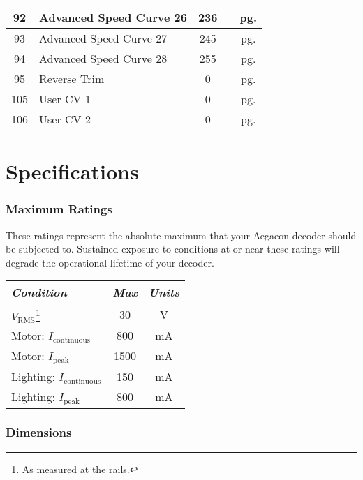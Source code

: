 \documentclass[12pt,letterpaper,draft]{memoir} %
\begin{document}
\begin{center}
\begin{longtable}{|c|l|c|c|c|}
92&Advanced Speed Curve 26&236&&pg. \pageref{CV92} \\ \hline
93&Advanced Speed Curve 27&245&&pg. \pageref{CV93} \\ \hline
94&Advanced Speed Curve 28&255&&pg. \pageref{CV94} \\ \hline
95&Reverse Trim&0&&pg. \pageref{CV95} \\ \hline
105&User CV 1&0&&pg. \pageref{CV105} \\ \hline
106&User CV 2&0&&pg. \pageref{CV106} \\ \hline
\end{longtable}
\end{center}

\chapter{Specifications}

\subsection*{Maximum Ratings}

These ratings represent the absolute maximum that your Aegaeon decoder should be subjected to. Sustained exposure to conditions at or near these ratings will degrade the operational lifetime of your decoder.

\begin{center}
\begin{longtable}{|l|c|c|}
\hline
\textit{Condition} & \textit{Max} & \textit{Units}\\ \hline
$V_{\mathrm{RMS}}$\footnote{As measured at the rails.} & 30 & V \\ \hline
Motor: $I_{\mathrm{continuous}}$ & 800 & mA \\ \hline
Motor: $I_{\mathrm{peak}}$ & 1500 & mA \\ \hline
Lighting: $I_{\mathrm{continuous}}$ & 150 & mA \\ \hline
Lighting: $I_{\mathrm{peak}} $ & 800 & mA \\ \hline
\end{longtable}
\end{center}

\subsection*{Dimensions}
\end{document}
